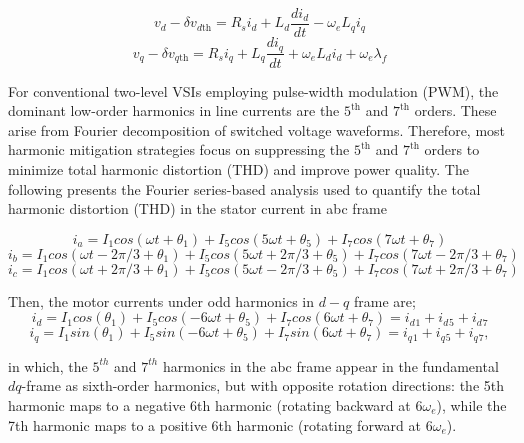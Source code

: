 \begin{equation}
v_d - \delta v_{d\mathrm{th}} = R_s i_d + L_d \frac{d i_d}{d t} - \omega_e L_q i_q 
\label{eq:v_d_new}
\end{equation}
\begin{equation}
v_q - \delta v_{q\mathrm{th}} = R_s i_q + L_q \frac{d i_q}{d t} + \omega_e L_d i_d + \omega_e \lambda_f 
\label{eq:v_q_new}
\end{equation}

For conventional two-level VSIs employing pulse-width modulation (PWM), the dominant low-order harmonics in line currents are the $5^{\text{th}}$ and $7^{\text{th}}$ orders. These arise from Fourier decomposition of switched voltage waveforms. Therefore, most harmonic mitigation strategies focus on suppressing the $5^{\text{th}}$ and $7^{\text{th}}$ orders to minimize total harmonic distortion (THD) and improve power quality. The following presents the Fourier series-based analysis used to quantify the total harmonic distortion (THD) in the stator current in abc frame  

\begin{equation}
i_a = I_1 cos(\omega t+\theta_1) + I_5 cos(5\omega t+\theta_5) +  I_7 cos(7\omega t+\theta_7)
\end{equation}
\begin{equation}
i_b =I_1 cos(\omega t - 2 \pi/3 +\theta_1) + I_5 cos(5\omega t + 2 \pi/3 +\theta_5) + I_7 cos(7\omega t - 2\pi/3 +\theta_7)
\end{equation}
\begin{equation}
i_c = I_1 cos(\omega t + 2 \pi/3 +\theta_1) +I_5 cos(5\omega t - 2 \pi/3 +\theta_5) + I_7 cos(7\omega t + 2 \pi/3 +\theta_7)
\end{equation}

Then, the motor currents under odd harmonics in $d-q$ frame are;
\begin{equation}
i_d = I_1 cos(\theta_1) + I_5cos(-6\omega t + \theta_5) + I_7cos(6\omega t + \theta_7) = i_d{}_{1} + i_d{}_{5} + i_d{}_{7} 
\label{eq:id_total}
\end{equation}
\begin{equation}
i_q = I_1 sin(\theta_1) + I_5sin(-6\omega t + \theta_5) + I_7sin(6\omega t + \theta_7) = i_q{}_{1} + i_q{}_{5} + i_q{}_{7},
\label{eq:id_total}
\end{equation}



in which, the $5^{th}$ and $7^{th}$ harmonics in the abc frame appear in the fundamental \(dq\)-frame as sixth-order harmonics, but with opposite rotation directions: the 5th harmonic maps to a negative 6th harmonic (rotating backward at \(6\omega_e\)), while the 7th harmonic maps to a positive 6th harmonic (rotating forward at \(6\omega_e\)).

